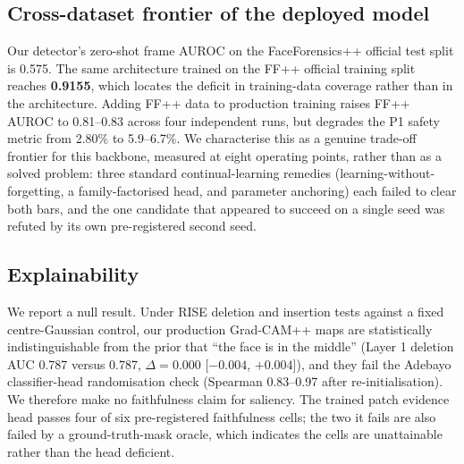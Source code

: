 \documentclass[conference]{IEEEtran}
\begin{document}
\subsection{Cross-dataset frontier of the deployed model}
\label{sec:frontier}
Our detector's zero-shot frame AUROC on the FaceForensics++ official test split is 0.575.
The same architecture trained on the FF++ official training split reaches \textbf{0.9155},
which locates the deficit in training-data coverage rather than in the architecture.
Adding FF++ data to production training raises FF++ AUROC to 0.81--0.83 across four
independent runs, but degrades the P1 safety metric from 2.80\% to 5.9--6.7\%. We
characterise this as a genuine trade-off frontier for this backbone, measured at eight
operating points, rather than as a solved problem: three standard continual-learning
remedies (learning-without-forgetting, a family-factorised head, and parameter anchoring)
each failed to clear both bars, and the one candidate that appeared to succeed on a single
seed was refuted by its own pre-registered second seed.

\subsection{Explainability}
\label{sec:xai}
We report a null result. Under RISE deletion and insertion tests against a fixed
centre-Gaussian control, our production Grad-CAM++ maps are statistically indistinguishable
from the prior that ``the face is in the middle'' (Layer 1 deletion AUC 0.787 versus 0.787,
$\Delta = 0.000$ [$-0.004$, $+0.004$]), and they fail the Adebayo classifier-head
randomisation check (Spearman 0.83--0.97 after re-initialisation). We therefore make no
faithfulness claim for saliency. The trained patch evidence head passes four of six
pre-registered faithfulness cells; the two it fails are also failed by a ground-truth-mask
oracle, which indicates the cells are unattainable rather than the head deficient.
\end{document}
